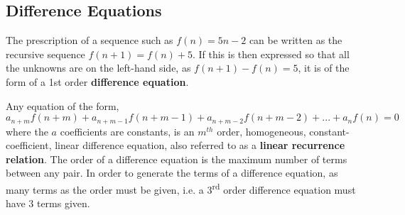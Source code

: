     \subsection{Difference Equations}
        The prescription of a sequence such as \(f(n) = 5n - 2\) can be written as the recursive sequence 
        \(f(n+1) = f(n) + 5\). If this is then expressed so that all the unknowns are on the left-hand side, as 
        \(f(n+1)-f(n)=5\), it is of the form of a 1st order \textbf{difference equation}.
        \par \hfill \break
        Any equation of the form,
        \begin{equation}
            a_{n+m} f(n+m)+a_{n+m-1} f(n+m-1)+a_{n+m-2} f(n+m-2)+ ... + a_n f(n) = 0
        \end{equation}
        where the \(a\) coefficients are constants, is an \(m^{th}\) order, homogeneous, constant-coefficient, linear 
        difference equation, also referred to as a \textbf{linear recurrence relation}. The order of a difference 
        equation is the maximum number of terms between any pair. In order to generate the terms of a difference 
        equation, as many terms as the order must be given, i.e. a 3\textsuperscript{rd} order difference equation must
        have 3 terms given.

